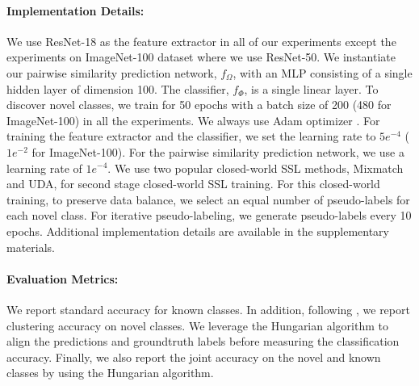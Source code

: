 \documentclass[runningheads]{eccv2022submission}
\begin{document}
 \vspace{-2mm}
\paragraph{\textbf{Implementation Details:}}
\label{para:implimentation}
We use ResNet-18 \cite{he2016deep} as the feature extractor in all of our experiments except the experiments on ImageNet-100 dataset where we use ResNet-50. We instantiate our pairwise similarity prediction network, $f_{\Omega}$, with an MLP consisting of a single hidden layer of dimension 100. The classifier, $f_{\Phi}$, is a single linear layer. To discover novel classes, we train for 50 epochs with a batch size of 200 (480 for ImageNet-100) in all the experiments. We always use Adam optimizer \cite{kingma2014adam}. For training the feature extractor and the classifier, we set the learning rate to $5e^{-4}$ ($1e^{-2}$ for ImageNet-100). For the pairwise similarity prediction network, we use a learning rate of $1e^{-4}$. We use two popular closed-world SSL methods, Mixmatch\cite{NIPS2019_8749_MixMatch} and UDA\cite{xie2019unsupervised}, for second stage closed-world SSL training. For this closed-world training, to preserve data balance, we select an equal number of pseudo-labels for each novel class. For iterative pseudo-labeling, we generate pseudo-labels every 10 epochs. Additional implementation details are available in the supplementary materials.

\vspace{-2mm}
\paragraph{\textbf{Evaluation Metrics:}}
We report standard accuracy for known classes. In addition, following \cite{han2019learning,Han2020Automatically,cao2022openworld,fini2021unified}, we report clustering accuracy on novel classes. We leverage the Hungarian algorithm \cite{kuhn1955hungarian} to align the predictions and groundtruth labels before measuring the classification accuracy. Finally, we also report the joint accuracy on the novel and known classes by using the Hungarian algorithm.
\vspace{-2mm}
\end{document}
